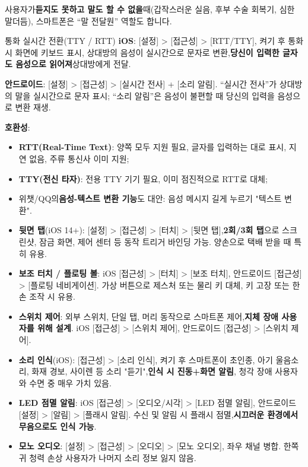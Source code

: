 
사용자가\textbf{듣지도 못하고 말도 할 수 없을}때(갑작스러운 실음, 후부 수술 회복기, 심한 말더듬), 스마트폰은 “말 전달원” 역할도 합니다.

\begin{tcbinfo}{통화 실시간 전환(TTY / RTT)}
\textbf{iOS}: [설정] > [접근성] > [RTT/TTY], 켜기 후 통화 시 화면에 키보드 표시, 상대방의 음성이 실시간으로 문자로 변환,\textbf{당신이 입력한 글자도 음성으로 읽어져}상대방에게 전달.

\textbf{안드로이드}: [설정] > [접근성] > [실시간 전사] + [소리 알림]. “실시간 전사”가 상대방의 말을 실시간으로 문자 표시; “소리 알림”은 음성이 불편할 때 당신의 입력을 음성으로 변환 재생.

\textbf{호환성}:

\begin{itemize}
  \item \textbf{RTT(Real-Time Text)}: 양쪽 모두 지원 필요, 글자를 입력하는 대로 표시, 지연 없음, 주류 통신사 이미 지원;
  \item \textbf{TTY(전신 타자)}: 전용 TTY 기기 필요, 이미 점진적으로 RTT로 대체;
  \item 위챗/QQ의\textbf{음성-텍스트 변환 기능}도 대안: 음성 메시지 길게 누르기 "텍스트 변환".
\end{itemize}

\end{tcbinfo}


\begin{itemize}
  \item \textbf{뒷면 탭}(iOS 14+): [설정] > [접근성] > [터치] > [뒷면 탭],\textbf{2회/3회 탭}으로 스크린샷, 잠금 화면, 제어 센터 등 동작 트리거 바인딩 가능. 양손으로 택배 받을 때 특히 유용.
  \item \textbf{보조 터치 / 플로팅 볼}: iOS [접근성] > [터치] > [보조 터치], 안드로이드 [접근성] > [플로팅 네비게이션]. 가상 버튼으로 제스처 또는 물리 키 대체, 키 고장 또는 한 손 조작 시 유용.
  \item \textbf{스위치 제어}: 외부 스위치, 단일 탭, 머리 동작으로 스마트폰 제어,\textbf{지체 장애 사용자를 위해 설계}. iOS [접근성] > [스위치 제어], 안드로이드 [접근성] > [스위치 제어].
  \item \textbf{소리 인식}(iOS): [접근성] > [소리 인식], 켜기 후 스마트폰이 초인종, 아기 울음소리, 화재 경보, 사이렌 등 소리 "듣기",\textbf{인식 시 진동+화면 알림}, 청각 장애 사용자와 수면 중 매우 가치 있음.
  \item \textbf{LED 점멸 알림}: iOS [접근성] > [오디오/시각] > [LED 점멸 알림], 안드로이드 [설정] > [알림] > [플래시 알림]. 수신 및 알림 시 플래시 점멸,\textbf{시끄러운 환경에서 무음으로도 인식 가능}.
  \item \textbf{모노 오디오}: [설정] > [접근성] > [오디오] > [모노 오디오], 좌우 채널 병합. 한쪽 귀 청력 손상 사용자가 나머지 소리 정보 잃지 않음.
\end{itemize}

